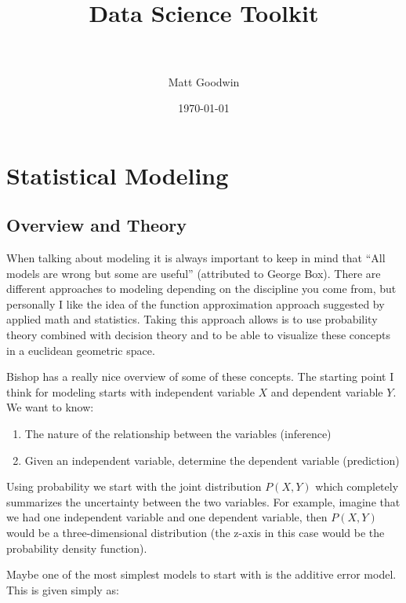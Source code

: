 \documentclass[paper=a4, fontsize=11pt]{scrartcl} %
\title{	
\normalfont \normalsize 
\horrule{0.5pt} \\[0.4cm] %
\huge Data Science Toolkit \\ %
\horrule{2pt} \\[0.5cm] %
}
\author{Matt Goodwin} %
\date{\normalsize\today} %
\numberwithin{equation}{section} %
\numberwithin{figure}{section} %
\numberwithin{table}{section} %
\begin{document}
\maketitle 

\tableofcontents
\newpage


\section{Statistical Modeling}
\subsection{Overview and Theory}

When talking about modeling it is always important to keep in mind that ``All models are wrong but some are useful'' (attributed to George Box). There are different approaches to modeling depending on the discipline you come from, but personally I like the idea of the function approximation approach suggested by applied math and statistics. Taking this approach allows is to use probability theory combined with decision theory and to be able to visualize these concepts in a euclidean geometric space.

Bishop has a really nice overview of some of these concepts. The starting point I think for modeling starts with independent variable $X$ and dependent variable $Y$. We want to know:

\begin{enumerate}
\item The nature of the relationship between the variables (inference)
\item Given an independent variable, determine the dependent variable (prediction)
\end{enumerate}

Using probability we start with the joint distribution $P(X,Y)$ which completely summarizes the uncertainty between the two variables. For example, imagine that we had one independent variable and one dependent variable, then $P(X,Y)$ would be a three-dimensional distribution (the z-axis in this case would be the probability density function).




Maybe one of the most simplest models to start with is the additive error model. This is given simply as:
\end{document}

